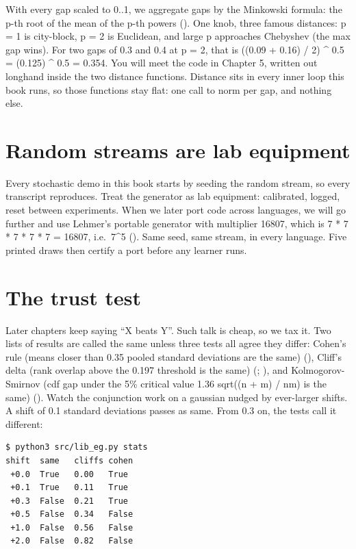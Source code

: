 \documentclass[
  justified]{tufte-book}
\begin{document}
With every gap scaled to 0..1, we aggregate gaps by the Minkowski
formula: the p-th root of the mean of the p-th powers
(). One knob,
three famous distances: p = 1 is city-block, p = 2 is Euclidean, and
large p approaches Chebyshev (the max gap wins). For two gaps of 0.3 and
0.4 at p = 2, that is ((0.09 + 0.16) / 2) \^{} 0.5 = (0.125) \^{} 0.5 =
0.354. You will meet the code in Chapter 5, written out longhand inside
the two distance functions. Distance sits in every inner loop this book
runs, so those functions stay flat: one call to norm per gap, and
nothing else.

\section{Random streams are lab
equipment}\label{random-streams-are-lab-equipment}

Every stochastic demo in this book starts by seeding the random stream,
so every transcript reproduces. Treat the generator as lab equipment:
calibrated, logged, reset between experiments. When we later port code
across languages, we will go further and use Lehmer's portable generator
with multiplier 16807, which is 7 * 7 * 7 * 7 * 7 = 16807, i.e.~7\^{}5
(). Same seed, same stream,
in every language. Five printed draws then certify a port before any
learner runs.

\section{The trust test}\label{the-trust-test}

Later chapters keep saying ``X beats Y''. Such talk is cheap, so we tax
it. Two lists of results are called the same unless three tests all
agree they differ: Cohen's rule (means closer than 0.35 pooled standard
deviations are the same) (), Cliff's
delta (rank overlap above the 0.197 threshold is the same)
(; ), and Kolmogorov-Smirnov (cdf gap under the 5\% critical
value 1.36 sqrt((n + m) / nm) is the same)
(). Watch the conjunction work on a
gaussian nudged by ever-larger shifts. A shift of 0.1 standard
deviations passes as same. From 0.3 on, the tests call it different:

\begin{verbatim}
$ python3 src/lib_eg.py stats
shift  same   cliffs cohen
 +0.0  True   0.00   True
 +0.1  True   0.11   True
 +0.3  False  0.21   True
 +0.5  False  0.34   False
 +1.0  False  0.56   False
 +2.0  False  0.82   False
\end{verbatim}
\end{document}
